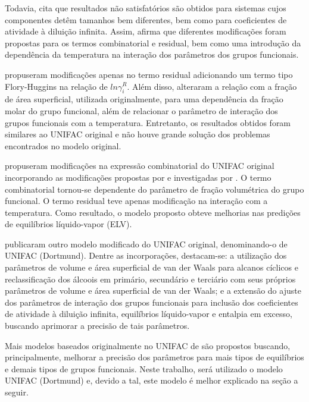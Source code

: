 Todavia,  cita que resultados não  
satisfatórios são obtidos para
sistemas cujos componentes detêm tamanhos bem diferentes, bem
como para coeficientes de atividade à diluição infinita. 
Assim,  afirma que diferentes modificações 
foram propostas para os termos combinatorial e residual, 
bem como uma introdução da dependência da temperatura na 
interação dos parâmetros dos grupos funcionais.

 propuseram modificações apenas no termo residual
adicionando um termo tipo Flory-Huggins na relação de $ln\gamma_i^R$. 
Além disso, alteraram a relação com a fração de área 
superficial, utilizada originalmente, para uma dependência 
da fração molar do grupo funcional, além de relacionar o 
parâmetro de interação dos grupos funcionais com a 
temperatura. Entretanto, os resultados obtidos foram 
similares ao UNIFAC original e não houve grande 
solução dos problemas encontrados no modelo original.

 propuseram modificações na expressão 
combinatorial do
UNIFAC original incorporando as modificações propostas por 
 e investigadas por . 
O termo combinatorial tornou-se dependente do parâmetro de 
fração volumétrica do grupo funcional. O termo residual teve 
apenas modificação na interação com a temperatura. Como 
resultado, o modelo proposto obteve melhorias nas predições 
de equilíbrios líquido-vapor (ELV).

 publicaram outro modelo modificado do
UNIFAC original, denominando-o de UNIFAC (Dortmund). Dentre as 
incorporações, destacam-se: a utilização dos parâmetros de 
volume e área superficial de van der Waals para alcanos 
cíclicos e reclassificação dos álcoois em primário, 
secundário e terciário com seus próprios parâmetros de 
volume e área superficial de van der Waals; e a extensão 
do ajuste dos parâmetros de interação dos grupos funcionais 
para inclusão dos coeficientes de atividade à diluição 
infinita, equilíbrios líquido-vapor e entalpia em excesso, 
buscando aprimorar a precisão de tais parâmetros.

Mais modelos baseados originalmente no UNIFAC de  são
propostos buscando, principalmente, melhorar a precisão dos 
parâmetros para mais tipos de equilíbrios e demais tipos de 
grupos funcionais. Neste trabalho, será utilizado o modelo 
UNIFAC (Dortmund) e, devido a tal, este modelo é melhor 
explicado na seção a seguir.

